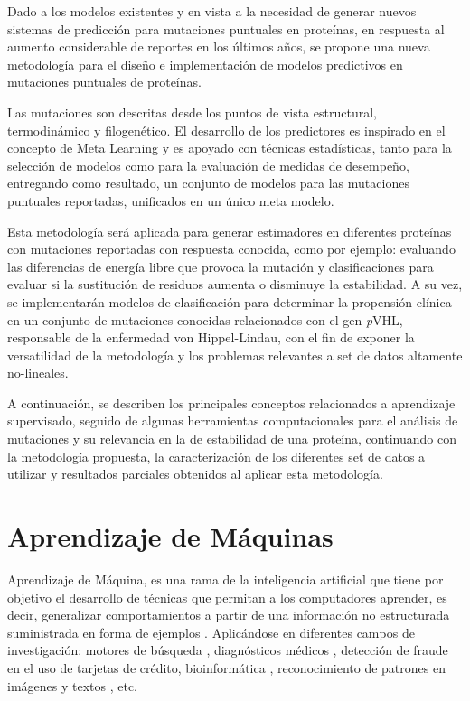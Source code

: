 Dado a los modelos existentes y en vista a la necesidad de generar nuevos sistemas de predicción para mutaciones puntuales en proteínas, en respuesta al aumento considerable de reportes en los últimos años, se propone una nueva metodología para el diseño e implementación de modelos predictivos en mutaciones puntuales de proteínas.

Las mutaciones son descritas desde los puntos de vista estructural, termodinámico y filogenético. El desarrollo de los predictores es inspirado en el concepto de Meta Learning y es apoyado con técnicas estadísticas, tanto para la selección de modelos como para la evaluación de medidas de desempeño, entregando como resultado, un conjunto de modelos para las mutaciones puntuales reportadas, unificados en un único meta modelo.

Esta metodología será aplicada para generar estimadores en diferentes proteínas con mutaciones reportadas con respuesta conocida, como por ejemplo: evaluando las diferencias de energía libre que provoca la mutación y clasificaciones para evaluar si la sustitución de residuos aumenta o disminuye la estabilidad. A su vez, se implementarán modelos de clasificación para determinar la propensión clínica en un conjunto de mutaciones conocidas relacionados con el gen \textit{p}VHL, responsable de la enfermedad von Hippel-Lindau, con el fin de exponer la versatilidad de la metodología y los problemas relevantes a set de datos altamente no-lineales.

A continuación, se describen los principales conceptos relacionados a aprendizaje supervisado, seguido de algunas herramientas computacionales para el análisis de mutaciones y su relevancia en la de estabilidad de una proteína, continuando con la metodología propuesta, la caracterización de los diferentes set de datos a utilizar y resultados parciales obtenidos al aplicar esta metodología.

\section{Aprendizaje de Máquinas}

Aprendizaje de Máquina, es una rama de la inteligencia artificial que tiene por objetivo el desarrollo de técnicas que permitan a los computadores aprender, es decir, generalizar comportamientos a partir de una información no estructurada suministrada en forma de ejemplos \cite{michie1994machine}. Aplicándose en diferentes campos de investigación: motores de búsqueda \cite{cooley1997web}, diagnósticos médicos \cite{7912315,ABDELAZIZ2018117}, detección de fraude en el uso de tarjetas de crédito, bioinformática \cite{juanito}, reconocimiento de patrones en imágenes \cite{imageA} y textos \cite{netzer2011reading,alm2005emotions}, etc. 

